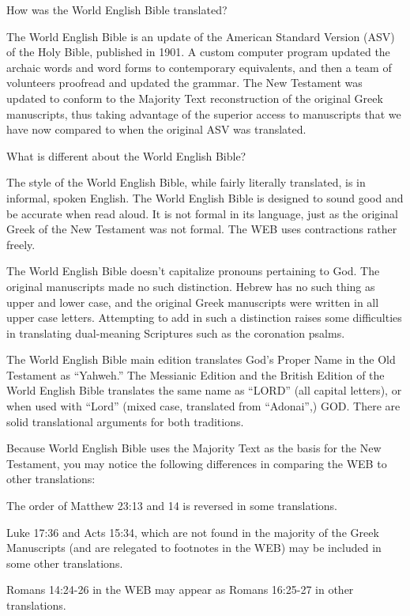 {\par }{\IS How was the World English Bible translated?
\par }{\IP The World English Bible is an update of the American Standard Version (ASV) of the Holy Bible, published in 1901. A custom computer program updated the archaic words and word forms to contemporary equivalents, and then a team of volunteers proofread and updated the grammar. The New Testament was updated to conform to the Majority Text reconstruction of the original Greek manuscripts, thus taking advantage of the superior access to manuscripts that we have now compared to when the original ASV was translated.
\par }{\IS What is different about the World English Bible?
\par }{\IP The style of the World English Bible, while fairly literally translated, is in informal, spoken English. The World English Bible is designed to sound good and be accurate when read aloud. It is not formal in its language, just as the original Greek of the New Testament was not formal. The WEB uses contractions rather freely.
\par }{\IP The World English Bible doesn’t capitalize pronouns pertaining to God. The original manuscripts made no such distinction. Hebrew has no such thing as upper and lower case, and the original Greek manuscripts were written in all upper case letters. Attempting to add in such a distinction raises some difficulties in translating dual-meaning Scriptures such as the coronation psalms.
\par }{\IP The World English Bible main edition translates God’s Proper Name in the Old Testament as “Yahweh.” The Messianic Edition and the British Edition of the World English Bible translates the same name as “LORD” (all capital letters), or when used with “Lord” (mixed case, translated from “Adonai”,) GOD. There are solid translational arguments for both traditions.
\par }{\IP Because World English Bible uses the Majority Text as the basis for the New Testament, you may notice the following differences in comparing the WEB to other translations:
\par }{\ILI The order of Matthew 23:13 and 14 is reversed in some translations.
\par }{\ILI Luke 17:36 and Acts 15:34, which are not found in the majority of the Greek Manuscripts (and are relegated to footnotes in the WEB) may be included in some other translations.
\par }{\ILI Romans 14:24-26 in the WEB may appear as Romans 16:25-27 in other translations.
}
